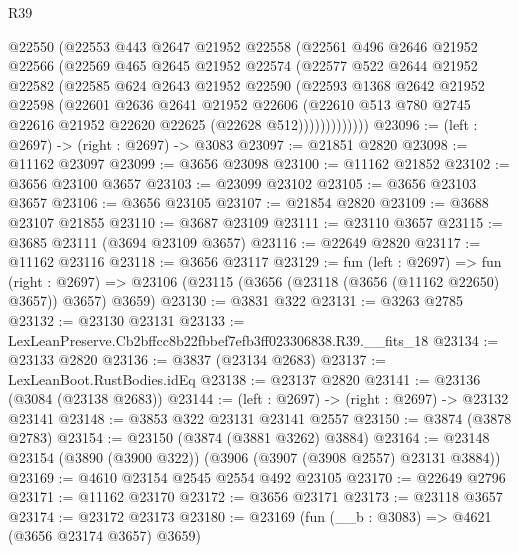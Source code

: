 \begin{lexlean}{R39}
\begin{coremodule}
            @22550
            (@22553
              @443
              @2647
              @21952
              @22558
              (@22561
                @496
                @2646
                @21952
                @22566
                (@22569
                  @465
                  @2645
                  @21952
                  @22574
                  (@22577
                    @522
                    @2644
                    @21952
                    @22582
                    (@22585
                      @624
                      @2643
                      @21952
                      @22590
                      (@22593
                        @1368
                        @2642
                        @21952
                        @22598
                        (@22601
                          @2636
                          @2641
                          @21952
                          @22606
                          (@22610
                            @513
                            @780
                            @2745
                            @22616
                            @21952
                            @22620
                            @22625
                            (@22628 @512)))))))))))))
@23096 := (left : @2697) -> (right : @2697) -> @3083
@23097 := @21851 @2820
@23098 := @11162 @23097
@23099 := @3656 @23098
@23100 := @11162 @21852
@23102 := @3656 @23100 @3657
@23103 := @23099 @23102
@23105 := @3656 @23103 @3657
@23106 := @3656 @23105
@23107 := @21854 @2820
@23109 := @3688 @23107 @21855
@23110 := @3687 @23109
@23111 := @23110 @3657
@23115 := @3685 @23111 (@3694 @23109 @3657)
@23116 := @22649 @2820
@23117 := @11162 @23116
@23118 := @3656 @23117
@23129 := fun (left : @2697) =>
  fun (right : @2697) => @23106 (@23115 (@3656 (@23118 (@3656 (@11162 @22650) @3657)) @3657) @3659)
@23130 := @3831 @322
@23131 := @3263 @2785
@23132 := @23130 @23131
@23133 := LexLeanPreserve.Cb2bffcc8b22fbbef7efb3ff023306838.R39.__fits_18
@23134 := @23133 @2820
@23136 := @3837 (@23134 @2683)
@23137 := LexLeanBoot.RustBodies.idEq
@23138 := @23137 @2820
@23141 := @23136 (@3084 (@23138 @2683))
@23144 := (left : @2697) -> (right : @2697) -> @23132 @23141
@23148 := @3853 @322 @23131 @23141 @2557
@23150 := @3874 (@3878 @2783)
@23154 := @23150 (@3874 (@3881 @3262) @3884)
@23164 := @23148 @23154 (@3890 (@3900 @322)) (@3906 (@3907 (@3908 @2557) @23131 @3884))
@23169 := @4610 @23154 @2545 @2554 @492 @23105
@23170 := @22649 @2796
@23171 := @11162 @23170
@23172 := @3656 @23171
@23173 := @23118 @3657
@23174 := @23172 @23173
@23180 := @23169 (fun (__b : @3083) => @4621 (@3656 @23174 @3657) @3659)

\end{coremodule}
\end{lexlean}
